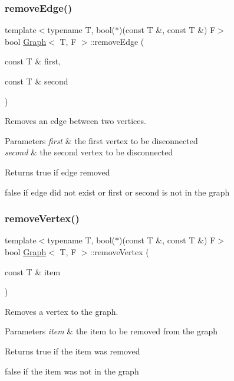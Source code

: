\subsubsection{\texorpdfstring{remove\+Edge()}{removeEdge()}}
{\footnotesize\ttfamily template$<$typename T, bool($\ast$)(const T \&, const T \&) F$>$ \\
bool \hyperlink{class_graph}{Graph}$<$ T, F $>$\+::remove\+Edge (\begin{DoxyParamCaption}\item[{const T \&}]{first,  }\item[{const T \&}]{second }\end{DoxyParamCaption})}



Removes an edge between two vertices. 


\begin{DoxyParams}{Parameters}
{\em first} & the first vertex to be disconnected \\
\hline
{\em second} & the second vertex to be disconnected \\
\hline
\end{DoxyParams}
\begin{DoxyReturn}{Returns}
true if edge removed 

false if edge did not exist or first or second is not in the graph 
\end{DoxyReturn}
\mbox{\label{class_graph_ab60cdf74dfbd8c7682b760338fb8a952}} 
\subsubsection{\texorpdfstring{remove\+Vertex()}{removeVertex()}}
{\footnotesize\ttfamily template$<$typename T, bool($\ast$)(const T \&, const T \&) F$>$ \\
bool \hyperlink{class_graph}{Graph}$<$ T, F $>$\+::remove\+Vertex (\begin{DoxyParamCaption}\item[{const T \&}]{item }\end{DoxyParamCaption})}



Removes a vertex to the graph. 


\begin{DoxyParams}{Parameters}
{\em item} & the item to be removed from the graph \\
\hline
\end{DoxyParams}
\begin{DoxyReturn}{Returns}
true if the item was removed 

false if the item was not in the graph 
\end{DoxyReturn}
\mbox{\label{class_graph_a98ac5dfc305ed0e31b6bb160503151ba}} 
